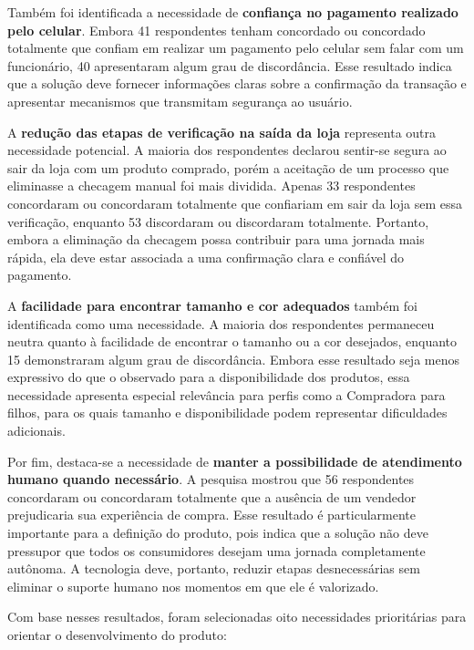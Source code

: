 Também foi identificada a necessidade de \textbf{confiança no pagamento realizado pelo celular}. Embora 41 respondentes tenham concordado ou concordado totalmente que confiam em realizar um pagamento pelo celular sem falar com um funcionário, 40 apresentaram algum grau de discordância. Esse resultado indica que a solução deve fornecer informações claras sobre a confirmação da transação e apresentar mecanismos que transmitam segurança ao usuário.

A \textbf{redução das etapas de verificação na saída da loja} representa outra necessidade potencial. A maioria dos respondentes declarou sentir-se segura ao sair da loja com um produto comprado, porém a aceitação de um processo que eliminasse a checagem manual foi mais dividida. Apenas 33 respondentes concordaram ou concordaram totalmente que confiariam em sair da loja sem essa verificação, enquanto 53 discordaram ou discordaram totalmente. Portanto, embora a eliminação da checagem possa contribuir para uma jornada mais rápida, ela deve estar associada a uma confirmação clara e confiável do pagamento.

A \textbf{facilidade para encontrar tamanho e cor adequados} também foi identificada como uma necessidade. A maioria dos respondentes permaneceu neutra quanto à facilidade de encontrar o tamanho ou a cor desejados, enquanto 15 demonstraram algum grau de discordância. Embora esse resultado seja menos expressivo do que o observado para a disponibilidade dos produtos, essa necessidade apresenta especial relevância para perfis como a Compradora para filhos, para os quais tamanho e disponibilidade podem representar dificuldades adicionais.

Por fim, destaca-se a necessidade de \textbf{manter a possibilidade de atendimento humano quando necessário}. A pesquisa mostrou que 56 respondentes concordaram ou concordaram totalmente que a ausência de um vendedor prejudicaria sua experiência de compra. Esse resultado é particularmente importante para a definição do produto, pois indica que a solução não deve pressupor que todos os consumidores desejam uma jornada completamente autônoma. A tecnologia deve, portanto, reduzir etapas desnecessárias sem eliminar o suporte humano nos momentos em que ele é valorizado.

Com base nesses resultados, foram selecionadas oito necessidades prioritárias para orientar o desenvolvimento do produto:

